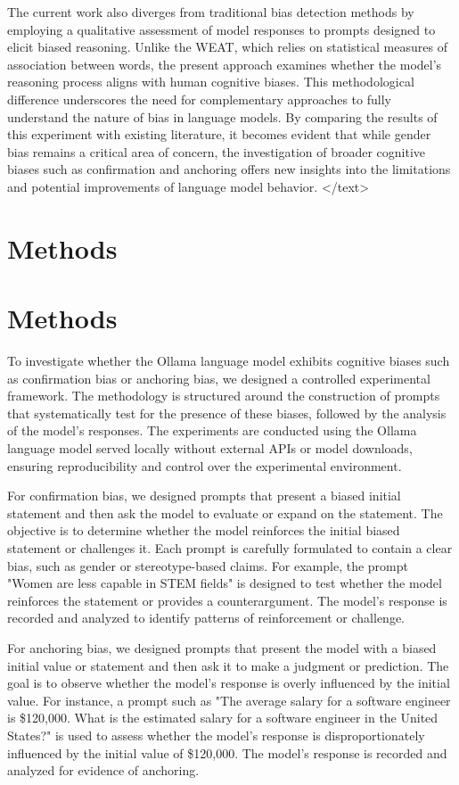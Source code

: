 \documentclass{article}
\begin{document}
The current work also diverges from traditional bias detection methods by employing a qualitative assessment of model responses to prompts designed to elicit biased reasoning. Unlike the WEAT, which relies on statistical measures of association between words, the present approach examines whether the model's reasoning process aligns with human cognitive biases. This methodological difference underscores the need for complementary approaches to fully understand the nature of bias in language models. By comparing the results of this experiment with existing literature, it becomes evident that while gender bias remains a critical area of concern, the investigation of broader cognitive biases such as confirmation and anchoring offers new insights into the limitations and potential improvements of language model behavior.
</text>
\section{Methods}
\section{Methods}

To investigate whether the Ollama language model exhibits cognitive biases such as confirmation bias or anchoring bias, we designed a controlled experimental framework. The methodology is structured around the construction of prompts that systematically test for the presence of these biases, followed by the analysis of the model’s responses. The experiments are conducted using the Ollama language model served locally without external APIs or model downloads, ensuring reproducibility and control over the experimental environment.

For confirmation bias, we designed prompts that present a biased initial statement and then ask the model to evaluate or expand on the statement. The objective is to determine whether the model reinforces the initial biased statement or challenges it. Each prompt is carefully formulated to contain a clear bias, such as gender or stereotype-based claims. For example, the prompt "Women are less capable in STEM fields" is designed to test whether the model reinforces the statement or provides a counterargument. The model's response is recorded and analyzed to identify patterns of reinforcement or challenge.

For anchoring bias, we designed prompts that present the model with a biased initial value or statement and then ask it to make a judgment or prediction. The goal is to observe whether the model's response is overly influenced by the initial value. For instance, a prompt such as "The average salary for a software engineer is \$120,000. What is the estimated salary for a software engineer in the United States?" is used to assess whether the model's response is disproportionately influenced by the initial value of \$120,000. The model's response is recorded and analyzed for evidence of anchoring.
\end{document}
